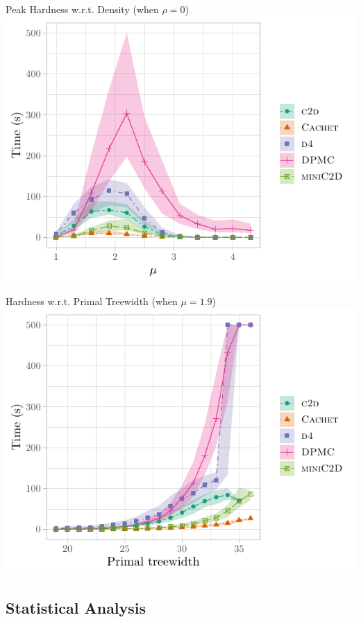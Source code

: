 \documentclass{beamer}
\begin{document}
\begin{frame}{Peak Hardness w.r.t. Density (when $\rho = 0$)}
  \centering
  \includegraphics{treewidth.pdf}
\end{frame}

\begin{frame}{Hardness w.r.t. Primal Treewidth (when $\mu = 1.9$)}
  \centering
  \includegraphics{treewidth2.pdf}
\end{frame}

\subsection{Statistical Analysis}
\end{document}
